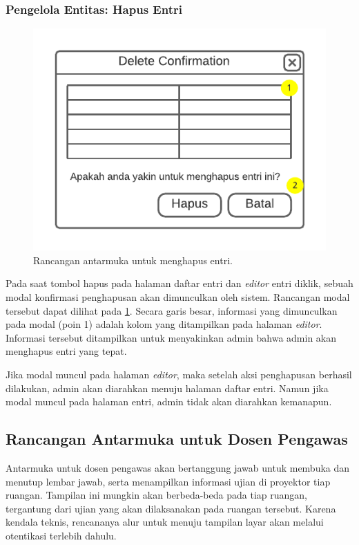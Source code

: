     
\subsubsection{Pengelola Entitas: Hapus Entri}
    \begin{figure}
        \centering
        \includegraphics{Gambar/mockups/Mockup--Admin - Entity Delete.pdf}
        \caption{Rancangan antarmuka untuk menghapus entri.}
        \label{fig:mockup_admin_entity_delete}
    \end{figure}
    Pada saat tombol hapus pada halaman daftar entri dan \textit{editor} entri
    diklik, sebuah modal konfirmasi penghapusan akan dimunculkan oleh sistem.
    Rancangan modal tersebut dapat dilihat pada
    \ref{fig:mockup_admin_entity_delete}. Secara garis besar, informasi yang
    dimunculkan pada modal (poin 1) adalah kolom yang ditampilkan pada halaman
    \textit{editor}. Informasi tersebut ditampilkan untuk menyakinkan admin
    bahwa admin akan menghapus entri yang tepat.
    
    Jika modal muncul pada halaman \textit{editor}, maka setelah aksi
    penghapusan berhasil dilakukan, admin akan diarahkan menuju halaman daftar
    entri. Namun jika modal muncul pada halaman entri, admin tidak akan
    diarahkan kemanapun.
    
\subsection{Rancangan Antarmuka untuk Dosen Pengawas}
    Antarmuka untuk dosen pengawas akan bertanggung jawab untuk membuka dan
    menutup lembar jawab, serta menampilkan informasi ujian di proyektor tiap
    ruangan. Tampilan ini mungkin akan berbeda-beda pada tiap ruangan,
    tergantung dari ujian yang akan dilaksanakan pada ruangan tersebut. Karena
    kendala teknis, rencananya alur untuk menuju tampilan layar akan melalui
    otentikasi terlebih dahulu. 
    
